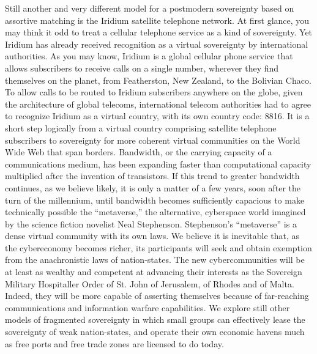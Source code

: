 \begin{Parallel}{97mm}{45mm}
  \ParallelPar
  \ParallelLText
  {Still another and very different model for a postmodern sovereignty based on assortive matching is the Iridium satellite telephone network. At first glance, you may think it odd to treat a cellular telephone service as a kind of sovereignty. Yet Iridium has already received recognition as a virtual sovereignty by international authorities. As you may know, Iridium is a global cellular phone service that allows subscribers to receive calls on a single number, wherever they find themselves on the planet, from Featherston, New Zealand, to the Bolivian Chaco. To allow calls to be routed to Iridium subscribers anywhere on the globe, given the architecture of global telecoms, international telecom authorities had to agree to recognize Iridium as a virtual country, with its own country code: 8816. It is a short step logically from a virtual country comprising satellite telephone subscribers to sovereignty for more coherent virtual communities on the World Wide Web that span borders. Bandwidth, or the carrying capacity of a communications medium, has been expanding faster than computational capacity multiplied after the invention of transistors. If this trend to greater bandwidth continues, as we believe likely, it is only a matter of a few years, soon after the turn of the millennium, until bandwidth becomes sufficiently capacious to make technically possible the “metaverse,” the alternative, cyberspace world imagined by the science fiction novelist Neal Stephenson. Stephenson's “metaverse” is a dense virtual community with its own laws. We believe it is inevitable that, as the cybereconomy becomes richer, its participants will seek and obtain exemption from the anachronistic laws of nation-states. The new cybercommunities will be at least as wealthy and competent at advancing their interests as the Sovereign Military Hospitaller Order of St. John of Jerusalem, of Rhodes and of Malta. Indeed, they will be more capable of asserting themselves because of far-reaching communications and information warfare capabilities. We explore still other models of fragmented sovereignty in which small groups can effectively lease the sovereignty of weak nation-states, and operate their own economic havens much as free ports and free trade zones are licensed to do today.}
  

\end{Parallel}
